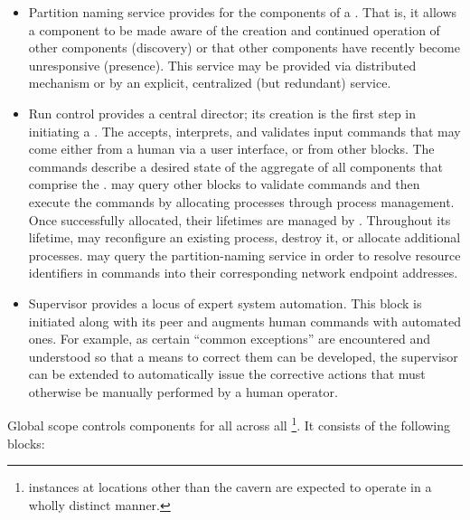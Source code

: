 \begin{itemize}
\item Partition naming service provides  for the components of a . 
  That is, it allows a component to be made aware  of the creation and continued operation of other components (discovery) or that other components have recently become unresponsive (presence). 
  This service may be provided via distributed  mechanism or by an explicit, centralized (but redundant) service.

\item Run control provides a central director;  its creation is the first step in initiating a . 
  The  accepts, interprets, and validates input commands that may come either from a human via a user interface, or from other blocks. 
  The commands describe a desired state of the aggregate of all components that comprise the . 
   may query other blocks to validate commands and then execute the commands by allocating processes through process management. 
  Once successfully allocated, their lifetimes are managed by . 
  Throughout its lifetime,  may reconfigure an existing process, destroy it, or allocate additional processes. 
   may query the partition-naming service in order to resolve resource identifiers in commands into their corresponding network endpoint addresses.  

\item Supervisor provides a locus of expert system automation. 
  This block is initiated along with its  peer and augments human commands with automated ones. 
  For example, as certain ``common exceptions'' are encountered and understood so that a means to correct them can be developed, the supervisor can be extended to automatically issue the corrective actions that must otherwise be manually performed by a human operator.

\end{itemize}

Global scope controls  components for all  across all \footnote{ instances at locations other than the  cavern are expected to operate in a wholly distinct manner.}.  It consists of the following blocks:


